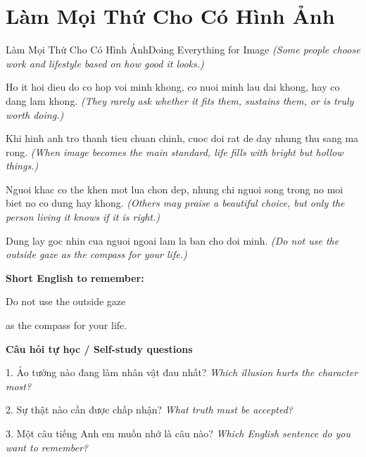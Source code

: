 \section{Làm Mọi Thứ Cho Có Hình Ảnh}
\begin{truyen}{Làm Mọi Thứ Cho Có Hình Ảnh}{Doing Everything for Image}
\textit{(Some people choose work and lifestyle based on how good it looks.)}

Ho it hoi dieu do co hop voi minh khong, co nuoi minh lau dai khong, hay co dang lam khong.
\textit{(They rarely ask whether it fits them, sustains them, or is truly worth doing.)}

Khi hinh anh tro thanh tieu chuan chinh, cuoc doi rat de day nhung thu sang ma rong.
\textit{(When image becomes the main standard, life fills with bright but hollow things.)}

Nguoi khac co the khen mot lua chon dep, nhung chi nguoi song trong no moi biet no co dung hay khong.
\textit{(Others may praise a beautiful choice, but only the person living it knows if it is right.)}

\end{truyen}

\begin{baihoc}
Dung lay goc nhin cua nguoi ngoai lam la ban cho doi minh.
\textit{(Do not use the outside gaze as the compass for your life.)}
\end{baihoc}

\begin{ghinhoanh}
\textbf{Short English to remember:}

Do not use the outside gaze

as the compass for your life.

\end{ghinhoanh}

\begin{tuhocnhanh}
\textbf{Câu hỏi tự học / Self-study questions}

1. Ảo tưởng nào đang làm nhân vật đau nhất? \textit{Which illusion hurts the character most?}

2. Sự thật nào cần được chấp nhận? \textit{What truth must be accepted?}

3. Một câu tiếng Anh em muốn nhớ là câu nào? \textit{Which English sentence do you want to remember?}
\end{tuhocnhanh}
\ngancach

